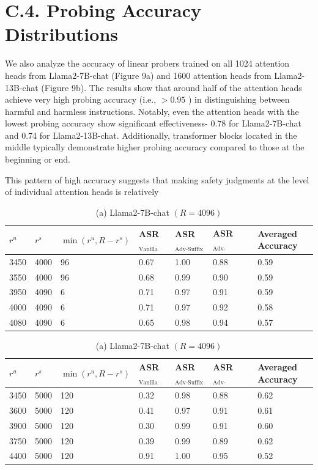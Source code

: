 \documentclass[10pt]{article}
\begin{document}
\section*{C.4. Probing Accuracy Distributions}
We also analyze the accuracy of linear probers trained on all 1024 attention heads from Llama2-7B-chat (Figure 9a) and 1600 attention heads from Llama2-13B-chat (Figure 9b). The results show that around half of the attention heads achieve very high probing accuracy (i.e., $>0.95$ ) in distinguishing between harmful and harmless instructions. Notably, even the attention heads with the lowest probing accuracy show significant effectiveness- 0.78 for Llama2-7B-chat and 0.74 for Llama2-13B-chat. Additionally, transformer blocks located in the middle typically demonstrate higher probing accuracy compared to those at the beginning or end.

This pattern of high accuracy suggests that making safety judgments at the level of individual attention heads is relatively

\begin{table}[h]
\begin{center}
\begin{tabular}{|l|l|l|l|l|l|l|}
\hline
$r^{u}$ & $r^{s}$ & $\min \left(r^{u}, R-r^{s}\right)$ & ASR $_{\text {Vanilla }}$ & ASR $_{\text {Adv-Suffix }}$ & ASR $_{\text {Adv-Decoding }}$ & Averaged Accuracy \\
\hline
3450 & 4000 & 96 & 0.67 & 1.00 & 0.88 & 0.59 \\
\hline
3550 & 4000 & 96 & 0.68 & 0.99 & 0.90 & 0.59 \\
\hline
3950 & 4090 & 6 & 0.71 & 0.97 & 0.91 & 0.59 \\
\hline
4000 & 4090 & 6 & 0.71 & 0.97 & 0.92 & 0.58 \\
\hline
4080 & 4090 & 6 & 0.65 & 0.98 & 0.94 & 0.57 \\
\hline
\end{tabular}
\captionsetup{labelformat=empty}
\caption{(a) Llama2-7B-chat $(R=4096)$}
\end{center}
\end{table}

\begin{table}[h]
\begin{center}
\captionsetup{labelformat=empty}
\caption{(a) Llama2-7B-chat $(R=4096)$}
\begin{tabular}{|l|l|l|l|l|l|l|}
\hline
$r^{u}$ & $r^{s}$ & $\min \left(r^{u}, R-r^{s}\right)$ & ASR ${ }_{\text {Vanilla }}$ & ASR $_{\text {Adv-Suffix }}$ & ASR $_{\text {Adv-Decoding }}$ & Averaged Accuracy \\
\hline
3450 & 5000 & 120 & 0.32 & 0.98 & 0.88 & 0.62 \\
\hline
3600 & 5000 & 120 & 0.41 & 0.97 & 0.91 & 0.61 \\
\hline
3900 & 5000 & 120 & 0.30 & 0.99 & 0.91 & 0.60 \\
\hline
3750 & 5000 & 120 & 0.39 & 0.99 & 0.89 & 0.62 \\
\hline
4400 & 5000 & 120 & 0.91 & 1.00 & 0.95 & 0.52 \\
\hline
\end{tabular}
\end{center}
\end{table}
\end{document}
